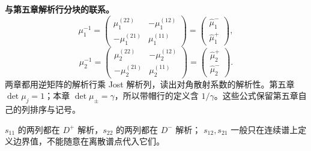 \documentclass[lang=cn,scheme=chinese,mode=simple,device=normal,color=blue,
math=cm,thmcnt=section,12pt]{elegantbook}
\begin{document}
\begin{remark}\quad\textbf{与第五章解析行分块的联系。}
    \begin{equation}
        \mu_1^{-1}
        =
        \begin{pmatrix}
            \mu_1^{(22)}  & -\mu_1^{(12)} \\
            -\mu_1^{(21)} & \mu_1^{(11)}
        \end{pmatrix}
        =
        \begin{pmatrix}
            \widehat\mu_1^- \\
            \widehat\mu_1^+
        \end{pmatrix},
        \tag{5.2.22}
    \end{equation}
    \begin{equation}
        \mu_2^{-1}
        =
        \begin{pmatrix}
            \mu_2^{(22)}  & -\mu_2^{(12)} \\
            -\mu_2^{(21)} & \mu_2^{(11)}
        \end{pmatrix}
        =
        \begin{pmatrix}
            \widehat\mu_2^+ \\
            \widehat\mu_2^-
        \end{pmatrix}.
        \tag{5.2.23}
    \end{equation}
    两章都用逆矩阵的解析行乘 Jost 解析列，读出对角散射系数的解析性。第五章 $\det\mu_j=1$；本章 $\det\mu_\pm=\gamma$，所以带帽行的定义含 $1/\gamma$。这些公式保留第五章自己的列排序与记号。
\end{remark}


$s_{11}$ 的两列都在 $D^+$ 解析，$s_{22}$ 的两列都在 $D^-$ 解析；
$s_{12},s_{21}$ 一般只在连续谱上定义边界值，不能随意在离散谱点代入它们。
\end{document}

